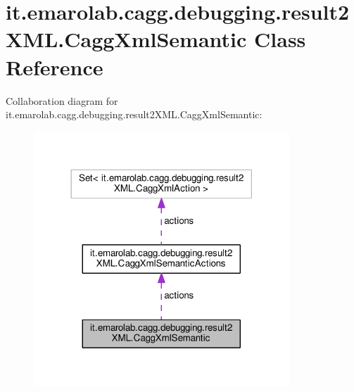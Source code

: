 \hypertarget{classit_1_1emarolab_1_1cagg_1_1debugging_1_1result2XML_1_1CaggXmlSemantic}{\section{it.\-emarolab.\-cagg.\-debugging.\-result2\-X\-M\-L.\-Cagg\-Xml\-Semantic Class Reference}
\label{classit_1_1emarolab_1_1cagg_1_1debugging_1_1result2XML_1_1CaggXmlSemantic}
}


Collaboration diagram for it.\-emarolab.\-cagg.\-debugging.\-result2\-X\-M\-L.\-Cagg\-Xml\-Semantic\-:\nopagebreak
\begin{figure}[H]
\begin{center}
\leavevmode
\includegraphics[width=272pt]{classit_1_1emarolab_1_1cagg_1_1debugging_1_1result2XML_1_1CaggXmlSemantic__coll__graph}
\end{center}
\end{figure}
